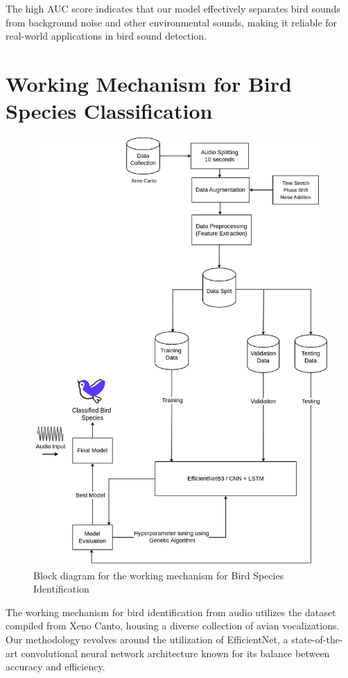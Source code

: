       The high AUC score indicates that our model effectively separates bird sounds from background noise and other environmental sounds, making it reliable for real-world applications in bird sound detection.



\newpage
\section{Working Mechanism for Bird Species Classification}
       \begin{figure}[h!]
            \centering
            \includegraphics[scale=0.33]{images/ClassificationMethodology.png}
            \caption{Block diagram for the working mechanism for Bird Species Identification}%
        \end{figure}
        The working mechanism for bird identification from audio utilizes the dataset
        compiled from Xeno Canto, housing a diverse collection of avian vocalizations.
        Our methodology revolves around the utilization of EfficientNet, a
        state-of-the-art convolutional neural network architecture known for its
        balance between accuracy and efficiency.

